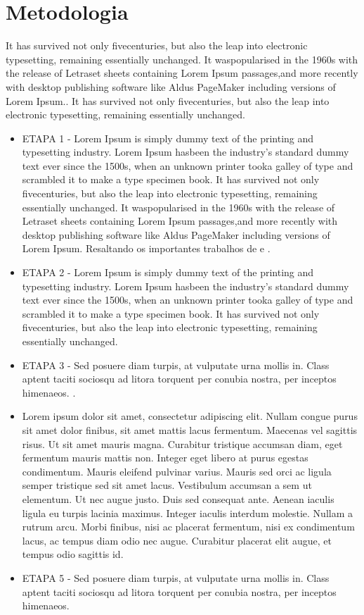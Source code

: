 \documentclass[
	12pt,				%
	openright,			%
	oneside,			%
	a4paper,			%
	chapter=TITLE,		%
	english,			%
	brazil,				%
	]{abntex2}
\begin{document}
\chapter{Metodologia}
It has survived not only fivecenturies, but also the leap into electronic typesetting, remaining essentially unchanged. It waspopularised in the 1960s with the release of Letraset sheets containing Lorem Ipsum passages,and more recently with desktop publishing software like Aldus PageMaker including versions of Lorem Ipsum.\cite{ahsan2016multipath}. It has survived not only fivecenturies, but also the leap into electronic typesetting, remaining essentially unchanged.

\begin{itemize}
\item ETAPA 1 - Lorem Ipsum is simply dummy text of the printing and typesetting industry. Lorem Ipsum hasbeen the industry’s standard dummy text ever since the 1500s, when an unknown printer tooka galley of type and scrambled it to make a type specimen book. It has survived not only fivecenturies, but also the leap into electronic typesetting, remaining essentially unchanged. It waspopularised in the 1960s with the release of Letraset sheets containing Lorem Ipsum passages,and more recently with desktop publishing software like Aldus PageMaker including versions of Lorem Ipsum. Resaltando os importantes trabalhos de \cite{ghareeb2008multiple} e \cite{afzal2019holistic}.
\item ETAPA 2 - Lorem Ipsum is simply dummy text of the printing and typesetting industry. Lorem Ipsum hasbeen the industry’s standard dummy text ever since the 1500s, when an unknown printer tooka galley of type and scrambled it to make a type specimen book. It has survived not only fivecenturies, but also the leap into electronic typesetting, remaining essentially unchanged. 
\item ETAPA 3 - Sed posuere diam turpis, at vulputate urna mollis in. Class aptent taciti sociosqu ad litora torquent per conubia nostra, per inceptos himenaeos. .
\item Lorem ipsum dolor sit amet, consectetur adipiscing elit. Nullam congue purus sit amet dolor finibus, sit amet mattis lacus fermentum. Maecenas vel sagittis risus. Ut sit amet mauris magna. Curabitur tristique accumsan diam, eget fermentum mauris mattis non. Integer eget libero at purus egestas condimentum. Mauris eleifend pulvinar varius. Mauris sed orci ac ligula semper tristique sed sit amet lacus. Vestibulum accumsan a sem ut elementum. Ut nec augue justo. Duis sed consequat ante. Aenean iaculis ligula eu turpis lacinia maximus. Integer iaculis interdum molestie. Nullam a rutrum arcu. Morbi finibus, nisi ac placerat fermentum, nisi ex condimentum lacus, ac tempus diam odio nec augue. Curabitur placerat elit augue, et tempus odio sagittis id.
\item ETAPA 5 - Sed posuere diam turpis, at vulputate urna mollis in. Class aptent taciti sociosqu ad litora torquent per conubia nostra, per inceptos himenaeos.
\end{itemize}
\end{document}
